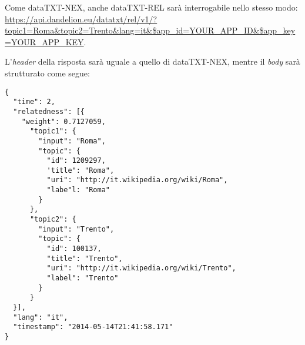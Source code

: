 		Come dataTXT-NEX, anche dataTXT-REL sarà interrogabile nello stesso modo: \url{https://api.dandelion.eu/datatxt/rel/v1/?topic1=Roma&topic2=Trento&lang=it&$app_id=YOUR_APP_ID&$app_key=YOUR_APP_KEY}.

		L'\emph{header} della risposta sarà uguale a quello di dataTXT-NEX, mentre il \emph{body} sarà strutturato come segue:

		\begin{lstlisting}
{
  "time": 2,
  "relatedness": [{
    "weight": 0.7127059,
      "topic1": {
        "input": "Roma",
        "topic": {
          "id": 1209297,
          'title": "Roma",
          "uri": "http://it.wikipedia.org/wiki/Roma",
          "labe"l: "Roma"
        }
      },
      "topic2": {
        "input": "Trento",
        "topic": {
          "id": 100137,
          "title": "Trento",
          "uri": "http://it.wikipedia.org/wiki/Trento",
          "label": "Trento"
        }
      }
  }],
  "lang": "it",
  "timestamp": "2014-05-14T21:41:58.171"
}
		\end{lstlisting}


